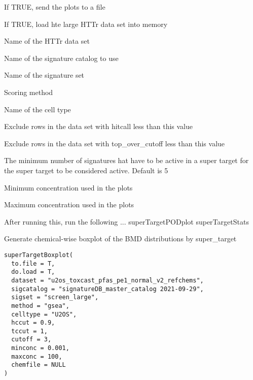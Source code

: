 \documentclass[letterpaper]{book}
\begin{document}
\begin{Arguments}
\begin{ldescription}
\item[\code{to.file}] If TRUE, send the plots to a file

\item[\code{do.load}] If TRUE, load hte large HTTr data set into memory

\item[\code{dataset}] Name of the HTTr data set

\item[\code{sigcatalog}] Name of the signature catalog to use

\item[\code{sigset}] Name of the signature set

\item[\code{method}] Scoring method

\item[\code{celltype}] Name of the cell type

\item[\code{hccut}] Exclude rows in the data set with hitcall less than this value

\item[\code{tccut}] Exclude rows in the data set with top\_over\_cutoff less than this value

\item[\code{cutoff}] The minimum number of signatures hat have to be active in a super
target for the super target to be considered active. Default is 5

\item[\code{minconc}] Minimum concentration used in the plots

\item[\code{maxconc}] Maximum concentration used in the plots

After running this, run the following ...
superTargetPODplot
superTargetStats
\end{ldescription}
\end{Arguments}
%
\begin{Description}\relax
Generate chemical-wise boxplot of the BMD distributions by super\_target
\end{Description}
%
\begin{Usage}
\begin{verbatim}
superTargetBoxplot(
  to.file = T,
  do.load = T,
  dataset = "u2os_toxcast_pfas_pe1_normal_v2_refchems",
  sigcatalog = "signatureDB_master_catalog 2021-09-29",
  sigset = "screen_large",
  method = "gsea",
  celltype = "U2OS",
  hccut = 0.9,
  tccut = 1,
  cutoff = 3,
  minconc = 0.001,
  maxconc = 100,
  chemfile = NULL
)
\end{verbatim}
\end{Usage}
\end{document}
